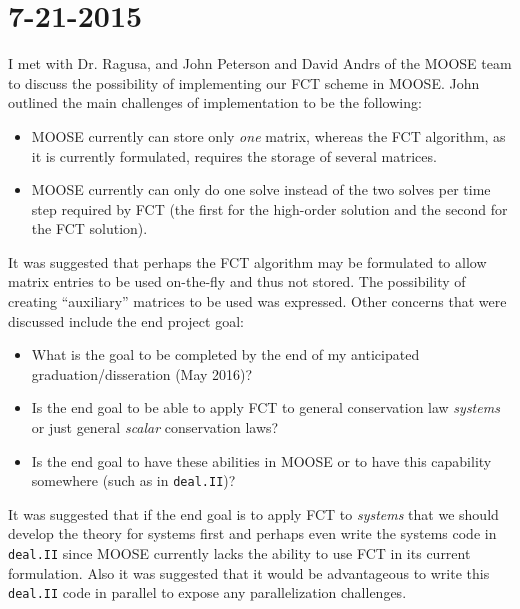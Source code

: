 \section*{7-21-2015}

I met with Dr. Ragusa, and John Peterson and David Andrs of the MOOSE team
to discuss the possibility of implementing our FCT scheme in MOOSE. John
outlined the main challenges of implementation to be the following:
\begin{itemize}
  \item MOOSE currently can store only \emph{one} matrix, whereas the FCT
     algorithm, as it is currently formulated, requires the storage of
     several matrices.
  \item MOOSE currently can only do one solve instead of the two solves
     per time step required by FCT (the first for the high-order solution
     and the second for the FCT solution).
\end{itemize}
It was suggested that perhaps the FCT algorithm may be formulated to
allow matrix entries to be used on-the-fly and thus not stored. The
possibility of creating ``auxiliary'' matrices to be used was expressed.
Other concerns that were discussed include the end project goal:
\begin{itemize}
  \item What is the goal to be completed by the end of my anticipated
     graduation/disseration (May 2016)?
  \item Is the end goal to be able to apply FCT to general conservation
     law \emph{systems} or just general \emph{scalar} conservation laws?
  \item Is the end goal to have these abilities in MOOSE or to have
     this capability somewhere (such as in \texttt{deal.II})?
\end{itemize}
It was suggested that if the end goal is to apply FCT to \emph{systems}
that we should develop the theory for systems first and perhaps even
write the systems code in \texttt{deal.II} since MOOSE currently
lacks the ability to use FCT in its current formulation. Also it was
suggested that it would be advantageous to write this \texttt{deal.II}
code in parallel to expose any parallelization challenges.
